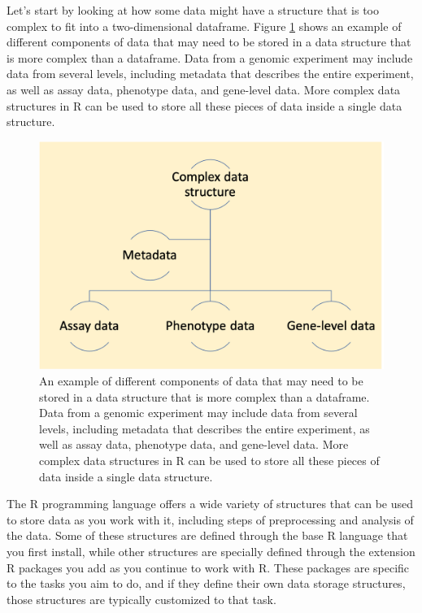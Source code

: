 \documentclass[]{tufte-book}
\begin{document}
Let's start by looking at how some data might have a structure that is too
complex to fit into a two-dimensional dataframe. Figure
\ref{fig:complexdatastructure} shows an example of different components of data
that may need to be stored in a data structure that is more complex than a
dataframe. Data from a genomic experiment may include data from several levels,
including metadata that describes the entire experiment, as well as assay data,
phenotype data, and gene-level data. More complex data structures in R can be
used to store all these pieces of data inside a single data structure.

\begin{figure}
\includegraphics[width=\textwidth]{figures/complex_data_structure} \caption[An example of different components of data that may need to be stored in a data structure that is more complex than a dataframe]{An example of different components of data that may need to be stored in a data structure that is more complex than a dataframe. Data from a genomic experiment may include data from several levels, including metadata that describes the entire experiment, as well as assay data, phenotype data, and gene-level data. More complex data structures in R can be used to store all these pieces of data inside a single data structure.}\label{fig:complexdatastructure}
\end{figure}

The R programming language offers a wide variety of structures that can be
used to store data as you work with it, including steps of preprocessing
and analysis of the data. Some of these structures are defined through the
base R language that you first install, while other structures are specially
defined through the extension R packages you add as you continue to work
with R. These packages are specific to the tasks you aim to do, and if they
define their own data storage structures, those structures are typically
customized to that task.
\end{document}
